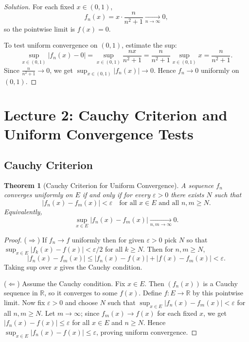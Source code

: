 \documentclass[12pt]{article}
\newtheorem{theorem}{Theorem}[section]
\theoremstyle{definition}
\begin{document}
\begin{proof}[Solution]
For each fixed $x\in(0,1)$,
\[
f_n(x)=x\cdot \frac{n}{n^2+1}\xrightarrow[n\to\infty]{}0,
\]
so the pointwise limit is $f(x)=0$.

To test uniform convergence on $(0,1)$, estimate the sup:
\[
\sup_{x\in(0,1)}|f_n(x)-0|
=\sup_{x\in(0,1)} \frac{n x}{n^2+1}
= \frac{n}{n^2+1}\sup_{x\in(0,1)} x
= \frac{n}{n^2+1}.
\]
Since $\frac{n}{n^2+1}\to 0$, we get $\sup_{x\in(0,1)}|f_n(x)|\to 0$.
Hence $f_n\to 0$ uniformly on $(0,1)$.
\end{proof}

\section{Lecture 2: Cauchy Criterion and Uniform Convergence Tests}

\subsection{Cauchy Criterion}

\begin{theorem}[Cauchy Criterion for Uniform Convergence]
A sequence $f_n$ converges uniformly on $E$ if and only if
for every $\varepsilon>0$ there exists $N$ such that
\[
|f_n(x)-f_m(x)|<\varepsilon\quad\text{for all }x\in E\text{ and all }n,m\ge N.
\]
Equivalently,
\[
\sup_{x\in E}|f_n(x)-f_m(x)|\xrightarrow[n,m\to\infty]{}0.
\]
\end{theorem}

\begin{proof}
($\Rightarrow$) If $f_n\to f$ uniformly then for given $\varepsilon>0$ pick $N$ so that
$\sup_{x\in E}|f_k(x)-f(x)|<\varepsilon/2$ for all $k\ge N$. Then for $n,m\ge N$,
\[
|f_n(x)-f_m(x)|\le |f_n(x)-f(x)|+|f(x)-f_m(x)|<\varepsilon.
\]
Taking sup over $x$ gives the Cauchy condition.

($\Leftarrow$) Assume the Cauchy condition. Fix $x\in E$. Then $(f_n(x))$ is a Cauchy sequence in $\mathbb{R}$,
so it converges to some $f(x)$. Define $f:E\to\mathbb{R}$ by this pointwise limit.
Now fix $\varepsilon>0$ and choose $N$ such that $\sup_{x\in E}|f_n(x)-f_m(x)|<\varepsilon$ for all $n,m\ge N$.
Let $m\to\infty$; since $f_m(x)\to f(x)$ for each fixed $x$, we get $|f_n(x)-f(x)|\le \varepsilon$ for all $x\in E$ and $n\ge N$.
Hence $\sup_{x\in E}|f_n(x)-f(x)|\le \varepsilon$, proving uniform convergence.
\end{proof}
\end{document}

